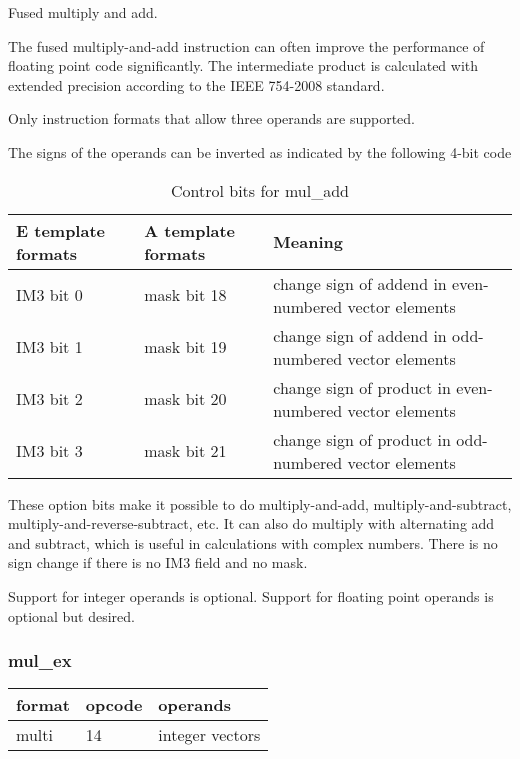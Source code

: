 \documentclass[forwardcom.tex]{subfiles}
\begin{document}
Fused multiply and add.
\vspace{2mm}

The fused multiply-and-add instruction can often improve the performance of floating point code significantly. The intermediate product is calculated with extended precision according to the IEEE 754-2008 standard.
\vspace{2mm}

Only instruction formats that allow three operands are supported.
\vspace{2mm}

The signs of the operands can be inverted as indicated by the following 4-bit code

\begin{longtable} {|p{20mm}|p{20mm}|p{75mm}|}
\caption{Control bits for mul\_add} 
\label{table:ControlBitsForMulAdd} \\
\endfirsthead
\endhead
\hline
\bfseries E template formats & \bfseries A template formats & \bfseries Meaning   \\
\hline
IM3 bit 0 & mask bit 18 & change sign of addend in even-numbered vector elements \\
IM3 bit 1 & mask bit 19 & change sign of addend in odd-numbered vector elements \\
IM3 bit 2 & mask bit 20 & change sign of product in even-numbered vector elements \\
IM3 bit 3 & mask bit 21 & change sign of product in odd-numbered vector elements \\
\hline
\end{longtable}

\vspace{2mm}
These option bits make it possible to do multiply-and-add, multiply-and-subtract, multiply-and-reverse-subtract, etc. It can also do multiply with alternating add and subtract, which is useful in calculations with complex numbers. 
There is no sign change if there is no IM3 field and no mask. 

\vspace{2mm}
Support for integer operands is optional. Support for floating point operands is optional but desired.

\subsubsection{mul\_ex}
\label{table:mulExInstruction}
\begin{tabular}{|p{12mm}|p{12mm}|p{110mm}|}
\hline
\bfseries format & \bfseries opcode & \bfseries operands \\ \hline
multi & 14 & integer vectors \\ \hline
\end{tabular}
\vspace{2mm}
\end{document}
